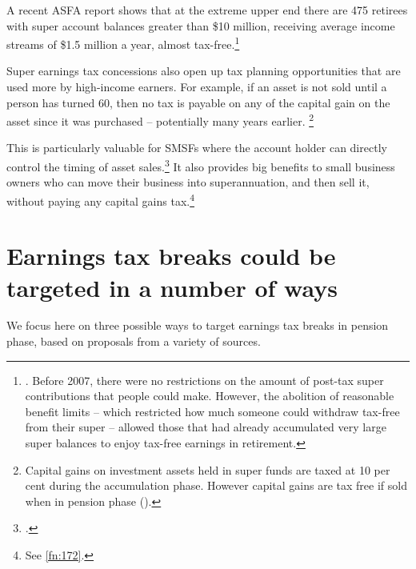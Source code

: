 A recent ASFA report shows that at the extreme upper end there are 475 retirees with super account balances greater than \$10 million, receiving average income streams of \$1.5 million a year, almost tax-free.\footnote{\textcite{ASFA2015TreasurySubmission}. Before 2007, there were no restrictions on the amount of post-tax super contributions that people could make. However, the abolition of reasonable benefit limits – which restricted how much someone could withdraw tax-free from their super – allowed those that had already accumulated very large super balances to enjoy tax-free earnings in retirement.}

Super earnings tax concessions also open up tax planning opportunities that are used more by high-income earners. For example, if an asset is not sold until a person has turned 60, then no tax is payable on any of the capital gain on the asset since it was purchased – potentially many years earlier.%
\footnote{Capital gains on investment assets held in super funds are taxed at 10 per cent during the accumulation phase. However capital gains are tax free if sold when in pension phase (\textcite[][69]{Treasury2015ReThink}).}

This is particularly valuable for SMSFs where the account holder can directly control the timing of asset sales.\footcite[][6]{Mercer2015SubmissionToReThink} It also provides big benefits to small business owners who can move their business into superannuation, and then sell it, without paying any capital gains tax.\footnote{See \vref{fn:172}.} 

\section{Earnings tax breaks could be targeted in a number of ways\label{sec:SUPER-6-3}}
We focus here on three possible ways to target earnings tax breaks in pension phase, based on proposals from a variety of sources.

